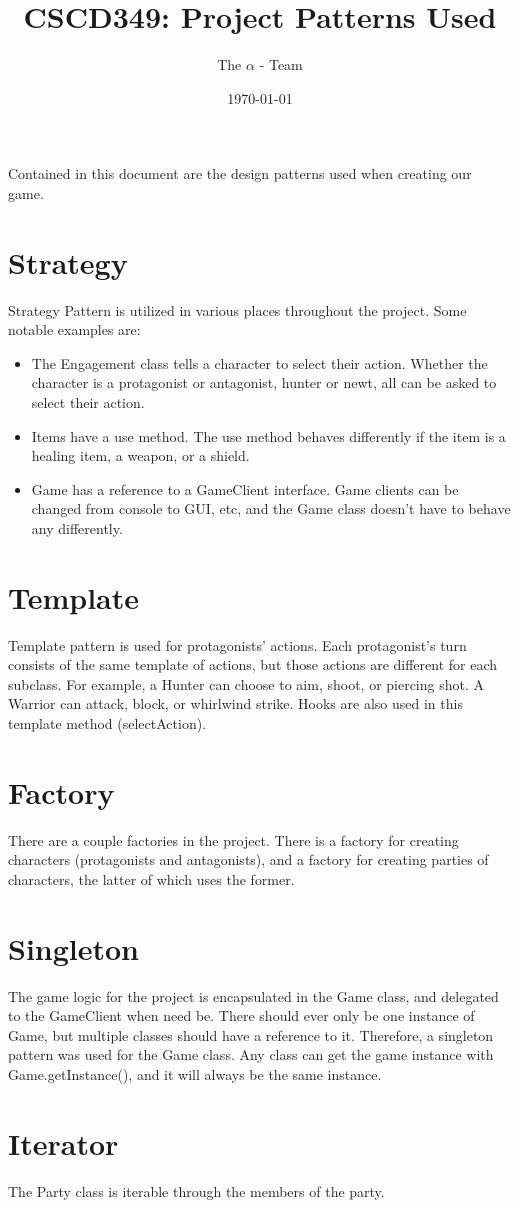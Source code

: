 \documentclass{article}
\title{CSCD349: Project Patterns Used}
\author{The $\alpha$ - Team}
\date{\today}
\begin{document}
\maketitle{}

\paragraph{}
Contained in this document are the design patterns used when creating our game.

\section{Strategy}
Strategy Pattern is utilized in various places throughout the project. Some notable examples are:
\begin{itemize}
\item The Engagement class tells a character to select their action. Whether the character is a protagonist or antagonist, hunter or newt, all can be asked to select their action.
\item Items have a use method. The use method behaves differently if the item is a healing item, a weapon, or a shield.
\item Game has a reference to a GameClient interface. Game clients can be changed from console to GUI, etc, and the Game class doesn't have to behave any differently.
\end{itemize}

\section{Template}
Template pattern is used for protagonists' actions. Each protagonist's turn consists of the same template of actions, but those actions are different for each subclass. For example, a Hunter can choose to aim, shoot, or piercing shot. A Warrior can attack, block, or whirlwind strike. Hooks are also used in this template method (selectAction).

\section{Factory}
There are a couple factories in the project. There is a factory for creating characters (protagonists and antagonists), and a factory for creating parties of characters, the latter of which uses the former.

\section{Singleton}
The game logic for the project is encapsulated in the Game class, and delegated to the GameClient when need be. There should ever only be one instance of Game, but multiple classes should have a reference to it. Therefore, a singleton pattern was used for the Game class. Any class can get the game instance with Game.getInstance(), and it will always be the same instance.

\section{Iterator}
The Party class is iterable through the members of the party.
\end{document}
